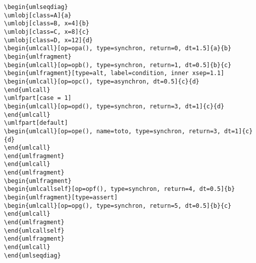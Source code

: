 \documentclass[a4paper,11pt]{report}
\begin{document}
\begin{lstlisting}
\begin{umlseqdiag}
\umlobj[class=A]{a}
\umlobj[class=B, x=4]{b}
\umlobj[class=C, x=8]{c}
\umlobj[class=D, x=12]{d}
\begin{umlcall}[op=opa(), type=synchron, return=0, dt=1.5]{a}{b}
\begin{umlfragment}
\begin{umlcall}[op=opb(), type=synchron, return=1, dt=0.5]{b}{c}
\begin{umlfragment}[type=alt, label=condition, inner xsep=1.1]
\begin{umlcall}[op=opc(), type=asynchron, dt=0.5]{c}{d}
\end{umlcall}
\umlfpart[case = 1]
\begin{umlcall}[op=opd(), type=synchron, return=3, dt=1]{c}{d}
\end{umlcall}
\umlfpart[default]
\begin{umlcall}[op=ope(), name=toto, type=synchron, return=3, dt=1]{c}{d}
\end{umlcall}
\end{umlfragment}
\end{umlcall}
\end{umlfragment}
\begin{umlfragment}
\begin{umlcallself}[op=opf(), type=synchron, return=4, dt=0.5]{b}
\begin{umlfragment}[type=assert]
\begin{umlcall}[op=opg(), type=synchron, return=5, dt=0.5]{b}{c}
\end{umlcall}
\end{umlfragment}
\end{umlcallself}
\end{umlfragment}
\end{umlcall}
\end{umlseqdiag}
\end{lstlisting}
\end{document}
